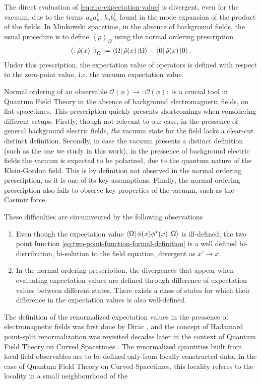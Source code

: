 The direct evaluation of \eqref{eq:rho-expectation-value} is divergent, even for the vacuum, due to the terms $a_n a^\dagger_n$, $b_n b_n^\dagger$ found in the mode expansion of the product of the fields. In Minkowski spacetime, in the absence of background fields, the usual procedure is to define $\left<\rho \right>_\Omega$ using the normal ordering prescription
\begin{align}
	\left<:\hat{\rho}(x) :\right>_\Omega:= \bra{\Omega} \hat{\rho}(x) \ket{\Omega} - \bra{0} \hat{\rho}(x) \ket{0}.
\end{align}
Under this prescription, the expectation value of operators is defined with respect to the zero-point value, i.e. the vacuum expectation value.

Normal ordering of an observable $\mathcal{O}(\phi) \rightarrow :\mathcal{O}(\phi):$ is a crucial tool in Quantum Field Theory in the absence of background electromagnetic fields, on flat spacetimes.  This prescription quickly presents shortcomings when considering different setups.
Firstly, though not relevant to our case, in the pressence of general background electric fields, \textit{the} vacuum state for the field lacks a clear-cut distinct definition. 
Secondly, in case the vacuum presents a distinct definition (such as the one we study in this work), in the pressence of background electric fields the vacuum is expected to be polarized, due to the quantum nature of the Klein-Gordon field. This is by definition not observed in the normal ordering prescription, as it is one of its key assumptions.
Finally, the normal ordering prescription also fails to observe key properties of the vacuum, such as the Casimir force.

These difficulties are circumvented by the following observations
\begin{enumerate}
	\item Even though the expectation value $ \bra{\Omega} \phi(x)\phi^*(x) \ket{\Omega} $ is ill-defined, the two point function \eqref{eq:two-point-function-formal-definition} 
	is a well defined bi-distribution, bi-solution to the field equation, divergent as $x' \to x$.
	\item In the normal ordering prescription, the divergences that appear when evaluating expectation values are defined through difference of expectation values between different states. There exists a class of states for which their difference in the expectation values is also well-defined.
\end{enumerate}
The definition of the renormalized expectation values in the pressence of electromagnetic fields was first done by Dirac \cite{Dirac1934}, and the concept of Hadamard point-split renormalization was revisited decades later in the context of Quantum Field Theory on Curved Spacetimes \cite{Wald1994}. 
The renormalized quantities built from local field observables are to be defined only from locally constructed data. In the case of Quantum Field Theory on Curved Spacetimes, this locality referes to the locality in a small neighbourhood of the 

